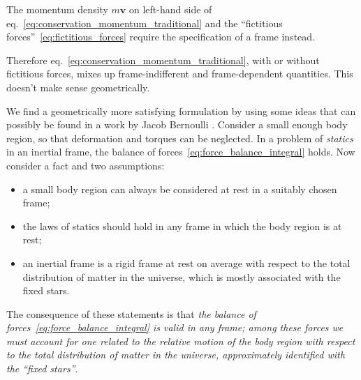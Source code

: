\documentclass[\ifafour a4paper,12pt,\else a5paper,10pt,\fi%
onecolumn,oneside,article,%
british%
]{memoir}
\theoremstyle{remark}
\theoremstyle{innote}
\newcommand*{\citep}{\parencites}
\newcommand*{\citey}{\parencites*}
\renewcommand*{\cites}{\parencites}
\renewcommand*{\|}{\nonscript\,\vert\nonscript\;\mathopen{}}
\newcommand*{\sect}{\S}%
\newcommand*{\eqn}{eq.}%
\newcommand*{\ydd}{m}
\newcommand*{\yd}{\ydd}
\newcommand*{\yvvt}{v}
\newcommand*{\yvt}{\bm{\yvvt}}
\begin{document}
The momentum density $\yd\yvt$ on left-hand side of
\eqn~\eqref{eq:conservation_momentum_traditional} and the
\enquote{fictitious forces}~\eqref{eq:fictitious_forces} require the
specification of a frame instead.

Therefore \eqn~\eqref{eq:conservation_momentum_traditional}, with or
without fictitious forces, mixes up frame-indifferent and frame-dependent
quantities. This doesn't make sense geometrically.

We find a geometrically more satisfying formulation by using some ideas
that can possibly be found in a work by Jacob Bernoulli
\citey{bernoulli1703} \citep[see][p.~104]{truesdell1968}  \cites{noll1963}[\sect~I.13]{truesdell1977_r1991}. Consider a small
enough body region, so that deformation and torques can be neglected. In a
problem of \emph{statics} in an inertial frame, the balance of
forces~\eqref{eq:force_balance_integral} holds. Now consider a fact and two
assumptions:
\begin{itemize}
\item a small body region can always be considered at rest in a suitably
  chosen frame;
\item the laws of statics should hold in any frame in which the body region
  is at rest;
\item an inertial frame is a rigid frame at rest on average with respect to
  the total distribution of matter in the universe, which is mostly
  associated with the fixed stars.
\end{itemize}
The consequence of these statements is that \emph{the balance of
  forces~\eqref{eq:force_balance_integral} is valid in any frame; among
  these forces we must account for one related to the relative motion of
  the body region with respect to the total distribution of matter in the
  universe, approximately identified with the \enquote{fixed stars}}.
\end{document}
